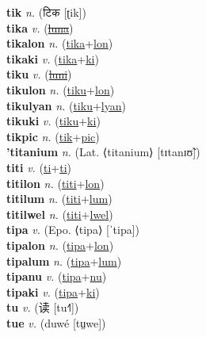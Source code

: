 \textbf{tik} \textit{n.} ({\devanagari{}टिक} [ʈik])
 \label{tik} \\
\textbf{tika} \textit{v.} (\hyperref[luna]{\sout{luna}})
 \label{tika} \\
\textbf{tikalon} \textit{n.} (\hyperref[tika]{tika}+\hyperref[lon]{lon})
 \label{tikalon} \\
\textbf{tikaki} \textit{v.} (\hyperref[tika]{tika}+\hyperref[ki]{ki})
 \label{tikaki} \\
\textbf{tiku} \textit{v.} (\hyperref[luni]{\sout{luni}})
 \label{tiku} \\
\textbf{tikulon} \textit{n.} (\hyperref[tiku]{tiku}+\hyperref[lon]{lon})
 \label{tikulon} \\
\textbf{tikulyan} \textit{n.} (\hyperref[tiku]{tiku}+\hyperref[lyan]{lyan})
 \label{tikulyan} \\
\textbf{tikuki} \textit{v.} (\hyperref[tiku]{tiku}+\hyperref[ki]{ki})
 \label{tikuki} \\
\textbf{tikpic} \textit{n.} (\hyperref[tik]{tik}+\hyperref[pic]{pic})
 \label{tikpic} \\
\textbf{'titanium} \textit{n.} (Lat. ⟨titanium⟩ [tɪtanɪʊ̃])
 \label{'titanium} \\
\textbf{titi} \textit{v.} (\hyperref[ti]{ti}+\hyperref[ti]{ti})
 \label{titi} \\
\textbf{titilon} \textit{n.} (\hyperref[titi]{titi}+\hyperref[lon]{lon})
 \label{titilon} \\
\textbf{titilum} \textit{n.} (\hyperref[titi]{titi}+\hyperref[lum]{lum})
 \label{titilum} \\
\textbf{titilwel} \textit{n.} (\hyperref[titi]{titi}+\hyperref[lwel]{lwel})
 \label{titilwel} \\
\textbf{tipa} \textit{v.} (Epo. ⟨tipa⟩ [ˈtipa])
 \label{tipa} \\
\textbf{tipalon} \textit{n.} (\hyperref[tipa]{tipa}+\hyperref[lon]{lon})
 \label{tipalon} \\
\textbf{tipalum} \textit{n.} (\hyperref[tipa]{tipa}+\hyperref[lum]{lum})
 \label{tipalum} \\
\textbf{tipanu} \textit{v.} (\hyperref[tipa]{tipa}+\hyperref[nu]{nu})
 \label{tipanu} \\
\textbf{tipaki} \textit{v.} (\hyperref[tipa]{tipa}+\hyperref[ki]{ki})
 \label{tipaki} \\
\textbf{tu} \textit{v.} ({\chinese{}读} [tu˧˥])
 \label{tu} \\
\textbf{tue} \textit{v.} ({\javanese{}duwé} [tṳwe])
 \label{tue} \\
